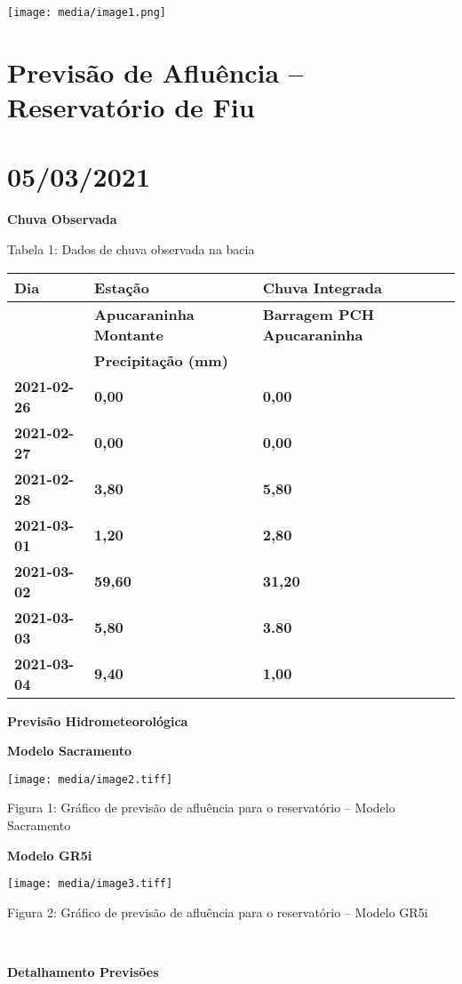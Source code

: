 \documentclass[]{article}
\date{}
\begin{document}
\texttt{[image: media/image1.png]}

\section{Previsão de Afluência -- Reservatório de
Fiu}\label{previsuxe3o-de-afluuxeancia-reservatuxf3rio-de-fiu}

\section{05/03/2021}\label{section}

\textbf{Chuva Observada}

Tabela 1: Dados de chuva observada na bacia

\begin{longtable}[]{@{}lll@{}}
\toprule
\textbf{Dia} & \textbf{Estação} & \textbf{Chuva
Integrada}\tabularnewline
\midrule
\endhead
& \textbf{Apucaraninha Montante} & \textbf{Barragem PCH
Apucaraninha}\tabularnewline
& \textbf{Precipitação (mm)}\tabularnewline
\textbf{2021-02-26} & \textbf{0,00} & \textbf{0,00}\tabularnewline
\textbf{2021-02-27} & \textbf{0,00} & \textbf{0,00}\tabularnewline
\textbf{2021-02-28} & \textbf{3,80} & \textbf{5,80}\tabularnewline
\textbf{2021-03-01} & \textbf{1,20} & \textbf{2,80}\tabularnewline
\textbf{2021-03-02} & \textbf{59,60} & \textbf{31,20}\tabularnewline
\textbf{2021-03-03} & \textbf{5,80} & \textbf{3.80}\tabularnewline
\textbf{2021-03-04} & \textbf{9,40} & \textbf{1,00}\tabularnewline
\bottomrule
\end{longtable}

\textbf{Previsão Hidrometeorológica}

\textbf{Modelo Sacramento}

\texttt{[image: media/image2.tiff]}

\protect\hypertarget{OLE_LINK1}{}{\protect\hypertarget{OLE_LINK2}{}{}}Figura
1: Gráfico de previsão de afluência para o reservatório -- Modelo
Sacramento

\textbf{Modelo GR5i}

\texttt{[image: media/image3.tiff]}

Figura 2: Gráfico de previsão de afluência para o reservatório -- Modelo
GR5i

\textbf{\\
}

\textbf{Detalhamento Previsões}
\end{document}
